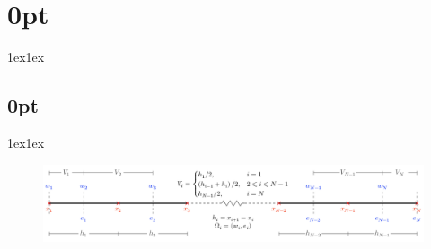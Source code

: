 \documentclass{article}
\begin{document}
\titlespacing*\section{0pt}{1ex}{1ex}
\titlespacing*\subsection{0pt}{1ex}{1ex}
%
\setlength\abovecaptionskip{8pt}
\setlength\belowcaptionskip{-15pt}
\setlength\textfloatsep{0pt}
%
\setlength\abovedisplayskip{1pt}
\setlength\belowdisplayskip{1pt}
\begin{figure}[H]
    \centering
    \includegraphics[width = \linewidth]{figures/1d-fvm-exam.pdf}
\end{figure}
\end{document}
